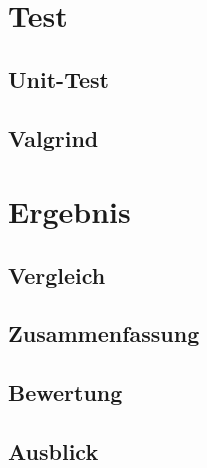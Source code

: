 \documentclass[a4paper]{scrartcl}
\begin{document}
\section{Test}\label{ch:Test}
\subsection{Unit-Test}\label{ch:Unit}

\subsection{Valgrind}\label{ch:Valgrind}

\section{Ergebnis}\label{ch:Ergebnis}

\subsection{Vergleich}\label{ch:Vergleich}
\subsection{Zusammenfassung}\label{ch:Zusammenfassung}
\subsection{Bewertung}\label{ch:Bewertung}
\subsection{Ausblick}\label{ch:Ausblick}

\newpage

%
%
\label{sec:Abkürzungsverzeichnis}

\begin{acronym}%

 	

\end{acronym}
\end{document}
